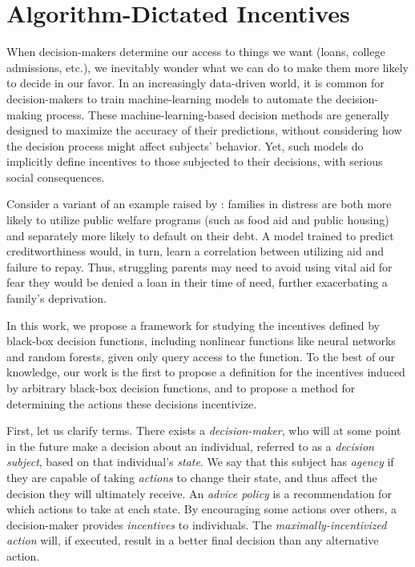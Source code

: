 \section{Algorithm-Dictated Incentives}
When decision-makers determine our access to things we want (loans, college admissions, etc.), we inevitably wonder what we can do to make them more likely to decide in our favor. In an increasingly data-driven world, it is common for decision-makers to train machine-learning models to automate the decision-making process. These machine-learning-based decision methods are generally designed to maximize the accuracy of their predictions, without considering how the decision process might affect subjects' behavior.
Yet, such models do implicitly define incentives to those subjected to their decisions, with serious social consequences. 

Consider a variant of an example raised by \citet{eubanks_2018}: families in distress are both more likely to utilize public welfare programs (such as food aid and public housing) and separately more likely to default on their debt. A model trained to predict creditworthiness would, in turn, learn a correlation between utilizing aid and failure to repay. Thus, struggling parents may need to avoid using vital aid for fear they would be denied a loan in their time of need, further exacerbating a family's deprivation.

In this work, we propose a framework for studying the incentives defined by black-box decision functions, including nonlinear functions like neural networks and random forests, given only query access to the function. To the best of our knowledge, our work is the first to propose a definition for the incentives induced by arbitrary black-box decision functions, and to propose a method for determining the actions these decisions incentivize.

First, let us clarify terms. There exists a \textit{decision-maker}, who will at some point in the future make a decision about an individual, referred to as a \textit{decision subject}, based on that individual's \textit{state}. We say that this subject has \textit{agency} if they are capable of taking \textit{actions} to change their state, and thus affect the decision they will ultimately receive. An \textit{advice policy} is a recommendation for which actions to take at each state. By encouraging some actions over others, a decision-maker provides \textit{incentives} to individuals. The \textit{maximally-incentivized action} will, if executed, result in a better final decision than any alternative action.

